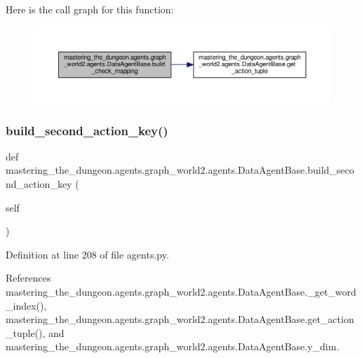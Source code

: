 Here is the call graph for this function\+:
\nopagebreak
\begin{figure}[H]
\begin{center}
\leavevmode
\includegraphics[width=350pt]{classmastering__the__dungeon_1_1agents_1_1graph__world2_1_1agents_1_1DataAgentBase_a67cb2755dc42ed432cec7e6b7efa2f98_cgraph}
\end{center}
\end{figure}
\mbox{\label{classmastering__the__dungeon_1_1agents_1_1graph__world2_1_1agents_1_1DataAgentBase_a7841fcde768420a09fe41f1bb9483774}} 
\subsubsection{\texorpdfstring{build\+\_\+second\+\_\+action\+\_\+key()}{build\_second\_action\_key()}}
{\footnotesize\ttfamily def mastering\+\_\+the\+\_\+dungeon.\+agents.\+graph\+\_\+world2.\+agents.\+Data\+Agent\+Base.\+build\+\_\+second\+\_\+action\+\_\+key (\begin{DoxyParamCaption}\item[{}]{self }\end{DoxyParamCaption})}



Definition at line 208 of file agents.\+py.



References mastering\+\_\+the\+\_\+dungeon.\+agents.\+graph\+\_\+world2.\+agents.\+Data\+Agent\+Base.\+\_\+get\+\_\+word\+\_\+index(), mastering\+\_\+the\+\_\+dungeon.\+agents.\+graph\+\_\+world2.\+agents.\+Data\+Agent\+Base.\+get\+\_\+action\+\_\+tuple(), and mastering\+\_\+the\+\_\+dungeon.\+agents.\+graph\+\_\+world2.\+agents.\+Data\+Agent\+Base.\+y\+\_\+dim.


